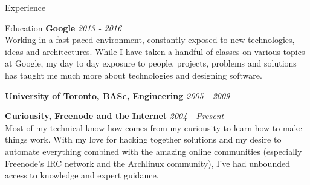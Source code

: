 \documentclass{resume}
\begin{document}
\begin{rSection}{Experience}
\begin{comment}
      \item Designed a prototype and implemented a web application to access administrative settings on a server using SOAP-based HTTP communication
      \item Debugged existing code and tested new code, ensuring the code will work in the future and save the company time and money having to deal with broken code later on
      \item Distributed a new version of a tool for use by multiple teams ensuring everyone involved was using and familiarizing themselves with the latest tools
      \item Provided technical support to product’s users, freeing them up from having to spend time figuring out what they had trouble with and allowing them to spend the time productively
      \item Wrote user friendly instructions on use of the new application, allowing the application to enter use quicker than it otherwise would have taken 
      \item Reported weekly on application status to two development groups, helping them keep on schedule
    \end{rSubsection}
    \end{comment}

  \end{rSection}

  \begin{rSection}{Education}
    {\bf Google} \hfill {\em 2013 - 2016} \\
    { Working in a fast paced environment, constantly exposed to new technologies, ideas and architectures. While I have taken a handful of classes on various topics at Google, my day to day exposure to people, projects, problems and solutions has taught me much more about technologies and designing software. }

    {\bf University of Toronto, BASc, Engineering} \hfill {\em 2005 - 2009}

\begin{comment}
    { \small Key courses: Computer Programming, Algorithms, Data Structures and Languages (A+); Communication and Design I \& II (A- \& A+); Operating Systems (A); Algorithms and Data Structures (A+); Introduction to Databases (A); Compilers and Interpreters (A+); Computer Systems Programming (A+); Computer Networks (A); Computer Security (A); Parallel Programming (A); Optimizing Compilers (A-) } \\
    { GPA: 3.08 }
\end{comment}

    {\bf Curiousity, Freenode and the Internet} \hfill {\em 2004 - Present} \\
    { Most of my technical know-how comes from my curiousity to learn how to make things work. With my love for hacking together solutions and my desire to automate everything combined with the amazing online communities (especially Freenode's IRC network and the Archlinux community), I've had unbounded access to knowledge and expert guidance.}

  \end{rSection}
\end{document}
